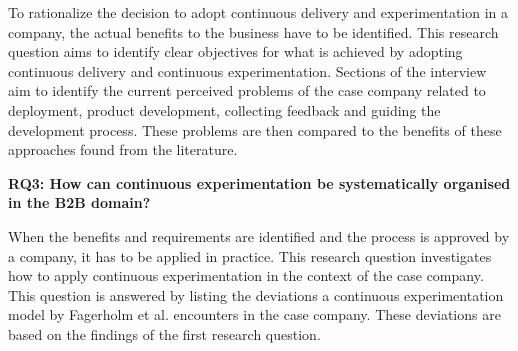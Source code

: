\documentclass[english, grading]{tktltiki2}
\theoremstyle{definition}
\theoremstyle{remark}
\begin{document}
\noindent To rationalize the decision to adopt continuous delivery and experimentation in a company, the actual benefits to the business have to be identified. This research question aims to identify clear objectives for what is achieved by adopting continuous delivery and continuous experimentation. Sections of the interview aim to identify the current perceived problems of the case company related to deployment, product development, collecting feedback and guiding the development process. These problems are then compared to the benefits of these approaches found from the literature.
\newline




\noindent \textbf{RQ3: How can continuous experimentation be systematically organised in the B2B domain?}

\noindent When the benefits and requirements are identified and the process is approved by a company, it has to be applied in practice. This research question investigates how to apply continuous experimentation in the context of the case company. This question is answered by listing the deviations a continuous experimentation model by Fagerholm et al.\cite{fagerholm2014building} encounters in the case company. These deviations are based on the findings of the first research question. \newline
\end{document}
